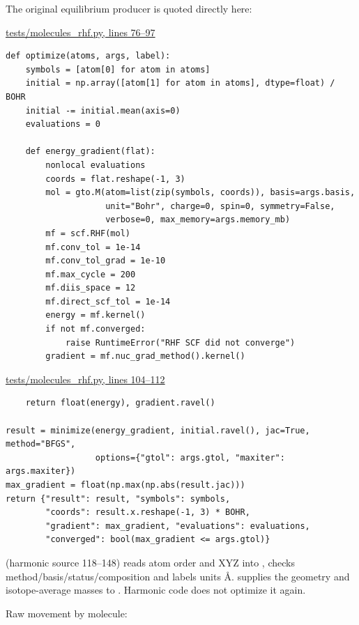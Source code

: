 \documentclass[10pt,a4paper]{article}
\begin{document}
The original equilibrium producer is quoted directly here:

\href{/Users/novaz/Desktop/qml2.0/tests/molecules\_rhf.py:76}{tests/molecules\_rhf.py, lines 76–97}

\begin{Verbatim}
def optimize(atoms, args, label):
    symbols = [atom[0] for atom in atoms]
    initial = np.array([atom[1] for atom in atoms], dtype=float) / BOHR
    initial -= initial.mean(axis=0)
    evaluations = 0

    def energy_gradient(flat):
        nonlocal evaluations
        coords = flat.reshape(-1, 3)
        mol = gto.M(atom=list(zip(symbols, coords)), basis=args.basis,
                    unit="Bohr", charge=0, spin=0, symmetry=False,
                    verbose=0, max_memory=args.memory_mb)
        mf = scf.RHF(mol)
        mf.conv_tol = 1e-14
        mf.conv_tol_grad = 1e-10
        mf.max_cycle = 200
        mf.diis_space = 12
        mf.direct_scf_tol = 1e-14
        energy = mf.kernel()
        if not mf.converged:
            raise RuntimeError("RHF SCF did not converge")
        gradient = mf.nuc_grad_method().kernel()
\end{Verbatim}
\href{/Users/novaz/Desktop/qml2.0/tests/molecules\_rhf.py:104}{tests/molecules\_rhf.py, lines 104–112}

\begin{Verbatim}
    return float(energy), gradient.ravel()

result = minimize(energy_gradient, initial.ravel(), jac=True, method="BFGS",
                  options={"gtol": args.gtol, "maxiter": args.maxiter})
max_gradient = float(np.max(np.abs(result.jac)))
return {"result": result, "symbols": symbols,
        "coords": result.x.reshape(-1, 3) * BOHR,
        "gradient": max_gradient, "evaluations": evaluations,
        "converged": bool(max_gradient <= args.gtol)}
\end{Verbatim}
 (harmonic source 118–148) reads atom order and XYZ into , checks method/basis/status/composition and labels units Å.  supplies the geometry and isotope-average masses to . Harmonic code does not optimize it again.

Raw movement by molecule:
\end{document}
